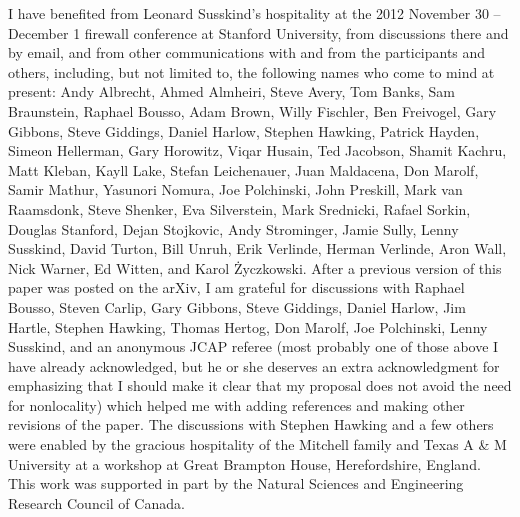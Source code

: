 \documentclass[12pt]{article}
\begin{document}
I have benefited from Leonard Susskind's hospitality at the 2012 November 30 -- December 1 firewall conference at Stanford University, from discussions there and by email, and from other communications with and from the participants and others, including, but not limited to, the following names who come to mind at present:  Andy Albrecht, Ahmed Almheiri, Steve Avery, Tom Banks, Sam Braunstein, Raphael Bousso, Adam Brown, Willy Fischler, Ben Freivogel, Gary Gibbons, Steve Giddings, Daniel Harlow, Stephen Hawking, Patrick Hayden, Simeon Hellerman, Gary Horowitz, Viqar Husain, Ted Jacobson, Shamit Kachru, Matt Kleban, Kayll Lake, Stefan Leichenauer, Juan Maldacena, Don Marolf, Samir Mathur, Yasunori Nomura, Joe Polchinski, John Preskill, Mark van Raamsdonk, Steve Shenker, Eva Silverstein, Mark Srednicki, Rafael Sorkin, Douglas Stanford, Dejan Stojkovic, Andy Strominger, Jamie Sully, Lenny Susskind, David Turton, Bill Unruh, Erik Verlinde, Herman Verlinde, Aron Wall, Nick Warner, Ed Witten, and Karol \.{Z}yczkowski.  After a previous version of this paper was posted on the arXiv, I am grateful for discussions with Raphael Bousso, Steven Carlip, Gary Gibbons, Steve Giddings, Daniel Harlow, Jim Hartle, Stephen Hawking, Thomas Hertog, Don Marolf, Joe Polchinski, Lenny Susskind, and an anonymous JCAP referee (most probably one of those above I have already acknowledged, but he or she deserves an extra acknowledgment for emphasizing that I should make it clear that my proposal does not avoid the need for nonlocality) which helped me with adding references and making other revisions of the paper.  The discussions with Stephen Hawking and a few others were enabled by the gracious hospitality of the Mitchell family and Texas A \& M University at a workshop at Great Brampton House, Herefordshire, England.  This work was supported in part by the Natural Sciences and Engineering Research Council of Canada.

\newpage

\baselineskip 4pt
\end{document}
